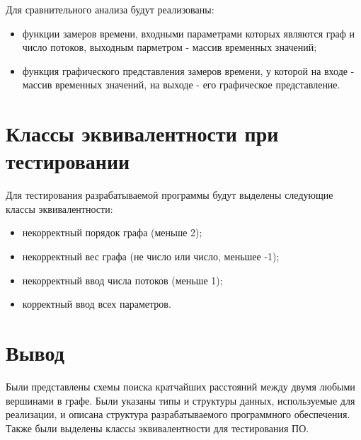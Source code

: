 Для сравнительного анализа будут реализованы:

\begin{itemize}
	\item функции замеров времени, входными параметрами которых являются граф и число потоков, выходным парметром - массив временных значений;
	\item функция графического представления замеров времени, у которой на входе - массив временных значений, на выходе - его графическое представление.
\end{itemize}

\section{Классы эквивалентности при тестировании}

Для тестирования разрабатываемой программы будут выделены следующие классы эквивалентности:

\begin{itemize}
	\item некорректный порядок графа (меньше 2);
	\item некорректный вес графа (не число или число, меньшее -1);
	\item некорректный ввод числа потоков (меньше 1);
	\item корректный ввод всех параметров.
\end{itemize}

\section{Вывод}

Были представлены схемы поиска кратчайших расстояний между двумя любыми вершинами в графе. Были указаны типы и структуры данных, используемые для реализации, и описана структура разрабатываемого программного обеспечения. Также были выделены классы эквивалентности для тестирования ПО.
